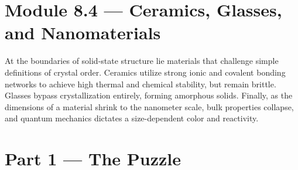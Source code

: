 \documentclass[12pt, a4paper]{book}
\begin{document}
\setcounter{chapter}{7}
\setcounter{section}{3}

\section{Module 8.4 --- Ceramics, Glasses, and Nanomaterials}

At the boundaries of solid-state structure lie materials that challenge simple definitions of crystal order. Ceramics utilize strong ionic and covalent bonding networks to achieve high thermal and chemical stability, but remain brittle. Glasses bypass crystallization entirely, forming amorphous solids. Finally, as the dimensions of a material shrink to the nanometer scale, bulk properties collapse, and quantum mechanics dictates a size-dependent color and reactivity.

\newpage

\section{Part 1 --- The Puzzle}
\end{document}
